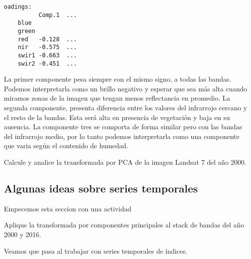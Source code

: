 \begin{exa}
    \begin{Verbatim}[fontsize=\small]
    oadings:
          Comp.1  ...
    blue
    green
    red   -0.128  ...
    nir   -0.575  ...
    swir1 -0.663  ...
    swir2 -0.451  ...
    \end{Verbatim}

    La primer componente pesa siempre con el mismo signo, a
    todas las bandas. Podemos interpretarla como un
    brillo negativo y esperar que sea m\'as alta cuando miramos zonas de la imagen que
    tengan menos reflectancia en promedio. La segunda componente, presenta diferencia
    entre los valores del infrarrojo cercano y el resto de la bandas. Esta ser\'a alta
    en presencia de vegetaci\'on y baja en su ausencia. La componente tres se comporta
    de forma similar pero con las bandas del infrarrojo medio, por lo tanto podemos
    interpretarla como una componente que varia seg\'un el contenido de humedad.
\end{exa}

\begin{act}
    Calcule y analice la transformada por PCA de la imagen Landsat 7 del año
    2000.
\end{act}

\subsection{Algunas ideas sobre series temporales}

Empecemos esta seccion con una actividad

\begin{act}
    Aplique la transformada por componentes principales al stack de bandas del
    año 2000 y 2016.
\end{act}

Veamos que pasa al trabajar con series temporales de \'indices.

